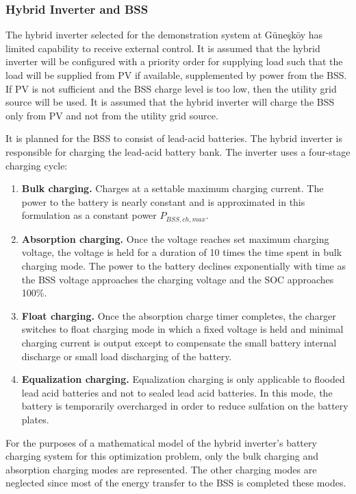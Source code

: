 \subsubsection{Hybrid Inverter and BSS}

The hybrid inverter selected for the demonstration system at Güneşköy has limited capability to receive external control. It is assumed that the hybrid inverter will be configured with a priority order for supplying load such that the load will be supplied from PV if available, supplemented by power from the BSS. If PV is not sufficient and the BSS charge level is too low, then the utility grid source will be used. It is assumed that the hybrid inverter will charge the BSS only from PV and not from the utility grid source.

It is planned for the BSS to consist of lead-acid batteries. The hybrid inverter is responsible for charging the lead-acid battery bank. The inverter uses a four-stage charging cycle:

\begin{enumerate}
	\item \textbf{Bulk charging.} Charges at a settable maximum charging current. The power to the battery is nearly constant and is approximated in this formulation as a constant power $P_{BSS,ch,max}$.
	\item \textbf{Absorption charging.} Once the voltage reaches set maximum charging voltage, the voltage is held for a duration of 10 times the time spent in bulk charging mode. The power to the battery declines exponentially with time as the BSS voltage approaches the charging voltage and the SOC approaches 100\%.
	\item \textbf{Float charging.} Once the absorption charge timer completes, the charger switches to float charging mode in which a fixed voltage is held and minimal charging current is output except to compensate the small battery internal discharge or small load discharging of the battery.
	\item \textbf{Equalization charging.} Equalization charging is only applicable to flooded lead acid batteries and not to sealed lead acid batteries. In this mode, the battery is temporarily overcharged in order to reduce sulfation on the battery plates.
\end{enumerate}

For the purposes of a mathematical model of the hybrid inverter's battery charging system for this optimization problem, only the bulk charging and absorption charging modes are represented. The other charging modes are neglected since most of the energy transfer to the BSS is completed these modes.

